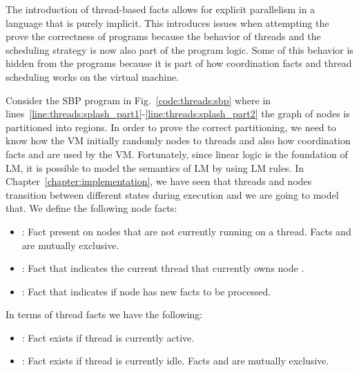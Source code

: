 The introduction of thread-based facts allows for explicit parallelism in a
language that is purely implicit. This introduces issues when attempting the
prove the correctness of programs because the behavior of threads and the
scheduling strategy is now also part of the program logic. Some of this behavior
is hidden from the programs because it is part of how coordination facts and
thread scheduling works on the virtual machine.

Consider the SBP program in Fig.~\ref{code:threads:sbp} where in
lines~\ref{line:threads:splash_part1}-\ref{line:threads:splash_part2} the graph
of nodes is partitioned into regions. In order to prove the correct
partitioning, we need to know how the VM initially randomly nodes to threads and
also how coordination facts  and  are used by
the VM.  Fortunately, since linear logic is the foundation of LM, it is possible
to model the semantics of LM by using LM rules. In
Chapter~\ref{chapter:implementation}, we have seen that threads and nodes
transition between different states during execution and we are going to model
that. We define the following node facts:

\begin{itemize}

   \item {}: Fact present on nodes that are not currently
      running on a thread. Facts  and  are
      mutually exclusive.

   \item {}: Fact that indicates the current thread
       that currently owns node .

   \item {}: Fact that indicates if node
       has new facts to be processed.

\end{itemize}

In terms of thread facts we have the following:

\begin{itemize}
   \item {}: Fact exists if thread  is currently
      active.

   \item {}: Fact exists if thread  is currently
      idle. Facts  and  are mutually exclusive.
\end{itemize}

